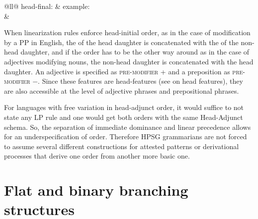 \documentclass[output=paper]{langsci/langscibook}
\begin{document}
\ex \begin{tabular}[t]{@{}ll@{}}
head-final:                            & example:\\
%
&%
\\
\end{tabular}
\zl
When linearization rules enforce head-initial order, as in the case of modification by a PP in
English, the \phonv of the head daughter is concatenated with the \phonv of the non-head daughter,
and if the order has to be the other way around as in the case of adjectives modifying nouns, the
non-head daughter is concatenated with the head daughter. An adjective is specified as
\textsc{pre-modifier} + and a preposition as \textsc{pre-modifier} $-$. Since these features are
head-features (see  on head features), they are also accessible at the
level of adjective phrases and prepositional phrases.

For languages with free variation in head-adjunct order, it would suffice to not state any LP
rule and one would get both orders with the same Head-Adjunct schema. So, the separation of
immediate dominance and linear precedence allows for an underspecification of order. Therefore HPSG
grammarians are not forced to assume several different constructions for attested patterns or
derivational processes that derive one order from another more basic one.


\section{Flat and binary branching structures}
\label{sec-binary-flat}
\end{document}
